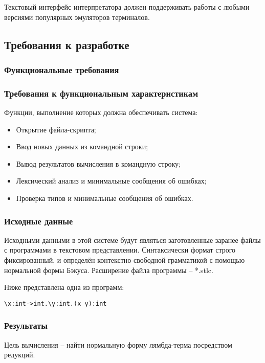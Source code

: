 Текстовый интерфейс интерпретатора должен поддерживать работы с любыми версиями популярных эмуляторов терминалов. 

\subsection{Требования к разработке}
\subsubsection{Функциональные требования}
\subsubsection{Требования к функциональным характеристикам}

Функции, выполнение которых должна обеспечивать система: 

\begin{itemize}
\item Открытие файла-скрипта;
\item Ввод новых данных из командной строки;
\item Вывод результатов вычисления в командную строку;
\item Лексический анализ и минимальные сообщения об ошибках;
\item Проверка типов и минимальные сообщения об ошибках.
\end{itemize}

\subsubsection{Исходные данные}

Исходными данными в этой системе будут являться заготовленные заранее файлы с программами в текстовом представлении. Синтаксически формат строго фиксированный, и определён контекстно-свободной грамматикой с помощью нормальной формы Бэкуса. Расширение файла программы – *.stlc.

Ниже представлена одна из программ:

\begin{lstlisting}
\x:int->int.\y:int.(x y):int
\end{lstlisting}

\subsubsection{Результаты}

Цель вычисления – найти нормальную форму лямбда-терма посредством редукций.

